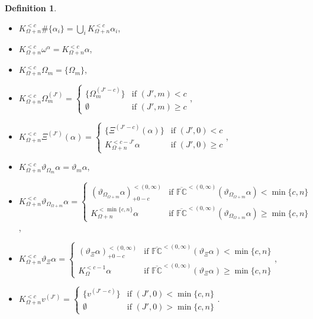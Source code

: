\documentclass[11pt]{amsart}
\theoremstyle{definition}
\newtheorem{definition}[theorem]{Definition}
\begin{document}
\begin{definition}
  
  \begin{itemize}
  \item $K^{<c}_{\Omega+n}\#\{\alpha_i\}=\bigcup_i K^{<c}_{\Omega+n}\alpha_i$,
  \item $K^{<c}_{\Omega+n}\omega^\alpha=K^{<c}_{\Omega+n}\alpha$,
  \item $K^{<c}_{\Omega+n}\Omega_m=\{\Omega_m\}$,
  \item $K^{<c}_{\Omega+n}\Omega^{(J')}_m=\left\{\begin{array}{ll}
                                          \{\Omega^{(J'-c)}_m\}&\text{if }(J',m)<c\\
                                          \emptyset&\text{if }(J',m)\geq c
                                        \end{array}\right.$,
  \item $K^{<c}_{\Omega+n}\Xi^{(J')}(\alpha)=\left\{\begin{array}{ll}
                                          \{\Xi^{(J'-c)}(\alpha)\}&\text{if }(J',0)<c\\
                                          K^{<c-J'}_{\Omega+n}\alpha&\text{if }(J',0)\geq c
                                        \end{array}\right.$,
  \item $K^{<c}_{\Omega+n}\vartheta_{\Omega_m}\alpha=\vartheta_m\alpha$,
  \item $K^{<c}_{\Omega+n}\vartheta_{\Omega_{\Omega+m}}\alpha=\left\{\begin{array}{ll}
                                            (\vartheta_{\Omega_{\Omega+m}}\alpha)^{< (0,\infty)}_{+0-c}&\text{if }\overline{\mathbb{FC}}^{<(0,\infty)}(\vartheta_{\Omega_{\Omega+m}}\alpha)< \min\{c,n\}\\
                                            K^{<\min\{c,n\}}_{\Omega+n}\alpha&\text{if }\overline{\mathbb{FC}}^{< (0,\infty)}(\vartheta_{\Omega_{\Omega+m}}\alpha)\geq \min\{c,n\}
                                          \end{array}\right.$,
  \item $K^{<c}_{\Omega+n}\vartheta_\Xi\alpha=\left\{\begin{array}{ll}
                                            (\vartheta_\Xi\alpha)^{< (0,\infty)}_{+0-c}&\text{if }\overline{\mathbb{FC}}^{<(0,\infty)}(\vartheta_\Xi\alpha)<\min\{c,n\}\\
                                            K^{<c-1}_\Omega\alpha&\text{if }\overline{\mathbb{FC}}^{<(0,\infty)}(\vartheta_\Xi\alpha)\geq\min\{c,n\}
                                          \end{array}\right.$,
  \item $K^{<c}_{\Omega+n} v^{(J')}=\left\{\begin{array}{ll}\{v^{(J'-c)}\}&\text{if }(J',0)< \min\{c,n\}\\
                                                                                        \emptyset&\text{if }(J',0)>\min\{c,n\}\end{array}\right.$.
 \end{itemize}


\end{definition}
\end{document}

